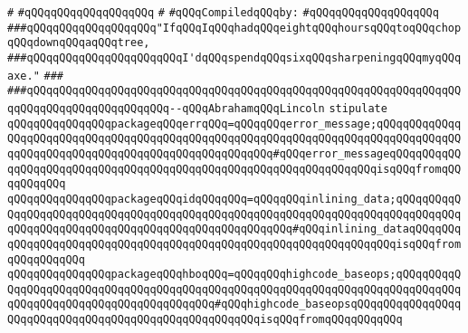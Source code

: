 \verb|#|\newline
\verb|#qQQqqQQqqQQqqQQqqQQq|\newline
\verb|#|\newline
\newline
\verb|#qQQqCompiledqQQqby:|\newline
\verb|#qQQqqQQqqQQqqQQqqQQq|\newline
\newline
\newline
\newline
\verb|###qQQqqQQqqQQqqQQqqQQq"IfqQQqIqQQqhadqQQqeightqQQqhoursqQQqtoqQQqchopqQQqdownqQQqaqQQqtree,|\newline
\verb|###qQQqqQQqqQQqqQQqqQQqqQQqI'dqQQqspendqQQqsixqQQqsharpeningqQQqmyqQQqaxe."|\newline
\verb|###|\newline
\verb|###qQQqqQQqqQQqqQQqqQQqqQQqqQQqqQQqqQQqqQQqqQQqqQQqqQQqqQQqqQQqqQQqqQQqqQQqqQQqqQQqqQQqqQQqqQQq--qQQqAbrahamqQQqLincoln|\newline
\newline
\newline
\newline
\verb|stipulate|\newline
\verb|qQQqqQQqqQQqqQQqpackageqQQqerrqQQq=qQQqqQQqerror_message;qQQqqQQqqQQqqQQqqQQqqQQqqQQqqQQqqQQqqQQqqQQqqQQqqQQqqQQqqQQqqQQqqQQqqQQqqQQqqQQqqQQqqQQqqQQqqQQqqQQqqQQqqQQqqQQqqQQqqQQqqQQq#qQQqerror_messageqQQqqQQqqQQqqQQqqQQqqQQqqQQqqQQqqQQqqQQqqQQqqQQqqQQqqQQqqQQqqQQqqQQqisqQQqfromqQQqqQQqqQQq|\newline
\verb|qQQqqQQqqQQqqQQqpackageqQQqidqQQqqQQq=qQQqqQQqinlining_data;qQQqqQQqqQQqqQQqqQQqqQQqqQQqqQQqqQQqqQQqqQQqqQQqqQQqqQQqqQQqqQQqqQQqqQQqqQQqqQQqqQQqqQQqqQQqqQQqqQQqqQQqqQQqqQQqqQQqqQQqqQQq#qQQqinlining_dataqQQqqQQqqQQqqQQqqQQqqQQqqQQqqQQqqQQqqQQqqQQqqQQqqQQqqQQqqQQqqQQqqQQqisqQQqfromqQQqqQQqqQQq|\newline
\verb|qQQqqQQqqQQqqQQqpackageqQQqhboqQQq=qQQqqQQqhighcode_baseops;qQQqqQQqqQQqqQQqqQQqqQQqqQQqqQQqqQQqqQQqqQQqqQQqqQQqqQQqqQQqqQQqqQQqqQQqqQQqqQQqqQQqqQQqqQQqqQQqqQQqqQQqqQQqqQQq#qQQqhighcode_baseopsqQQqqQQqqQQqqQQqqQQqqQQqqQQqqQQqqQQqqQQqqQQqqQQqqQQqqQQqisqQQqfromqQQqqQQqqQQq|\newline
